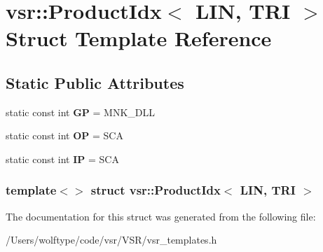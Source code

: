 \hypertarget{structvsr_1_1_product_idx_3_01_l_i_n_00_01_t_r_i_01_4}{\section{vsr\-:\-:Product\-Idx$<$ L\-I\-N, T\-R\-I $>$ Struct Template Reference}
\label{structvsr_1_1_product_idx_3_01_l_i_n_00_01_t_r_i_01_4}
}
\subsection*{Static Public Attributes}
\begin{DoxyCompactItemize}
\item 
\hypertarget{structvsr_1_1_product_idx_3_01_l_i_n_00_01_t_r_i_01_4_a9429ae8c5708ae1208068a12bf008775}{static const int {\bfseries G\-P} = M\-N\-K\-\_\-\-D\-L\-L}\label{structvsr_1_1_product_idx_3_01_l_i_n_00_01_t_r_i_01_4_a9429ae8c5708ae1208068a12bf008775}

\item 
\hypertarget{structvsr_1_1_product_idx_3_01_l_i_n_00_01_t_r_i_01_4_a1ede9fa1e70fd6881ae2ca0d21bcc944}{static const int {\bfseries O\-P} = S\-C\-A}\label{structvsr_1_1_product_idx_3_01_l_i_n_00_01_t_r_i_01_4_a1ede9fa1e70fd6881ae2ca0d21bcc944}

\item 
\hypertarget{structvsr_1_1_product_idx_3_01_l_i_n_00_01_t_r_i_01_4_a8144b63791621b8bffb0bdfe84b1b2cb}{static const int {\bfseries I\-P} = S\-C\-A}\label{structvsr_1_1_product_idx_3_01_l_i_n_00_01_t_r_i_01_4_a8144b63791621b8bffb0bdfe84b1b2cb}

\end{DoxyCompactItemize}
\subsubsection*{template$<$$>$ struct vsr\-::\-Product\-Idx$<$ L\-I\-N, T\-R\-I $>$}



The documentation for this struct was generated from the following file\-:\begin{DoxyCompactItemize}
\item 
/\-Users/wolftype/code/vsr/\-V\-S\-R/vsr\-\_\-templates.\-h\end{DoxyCompactItemize}
